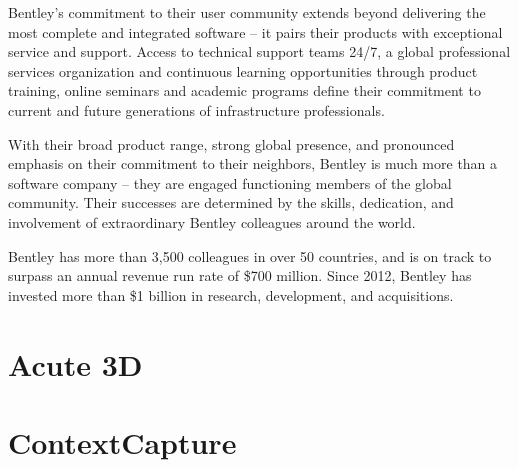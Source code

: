 Bentley’s commitment to their user community extends beyond delivering the most complete and integrated software -- it pairs their products with exceptional service and support. Access to technical support teams 24/7, a global professional services organization and continuous learning opportunities through product training, online seminars and academic programs define their commitment to current and future generations of infrastructure professionals.

With their broad product range, strong global presence, and pronounced emphasis on their commitment to their neighbors, Bentley is much more than a software company -- they are engaged functioning members of the global community. Their successes are determined by the skills, dedication, and involvement of extraordinary Bentley colleagues around the world.

Bentley has more than 3,500 colleagues in over 50 countries, and is on track to surpass an annual revenue run rate of \$700 million. Since 2012, Bentley has invested more than \$1 billion in research, development, and acquisitions.


\section{Acute 3D}


\section{ContextCapture}
